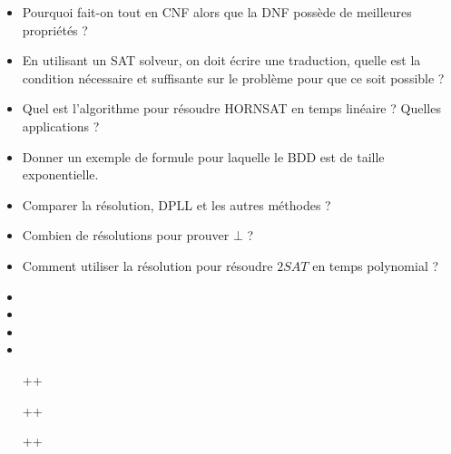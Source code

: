 \documentclass{agregfiche}
\begin{document}
\begin{itemize}
    \item Pourquoi fait-on tout en CNF alors que la DNF possède de meilleures
      propriétés ?
    \item En utilisant un SAT solveur, on doit écrire une traduction, quelle
        est la condition nécessaire et suffisante sur le problème pour que ce soit
        possible ?
    \item Quel est l'algorithme pour résoudre HORNSAT en temps linéaire ?
        Quelles applications ?
    \item Donner un exemple de formule pour laquelle le BDD est de
    taille
        exponentielle.
      \item Comparer la résolution, DPLL et les autres méthodes ?
      \item Combien de résolutions pour prouver $\bot$ ?
      \item Comment utiliser la résolution pour résoudre $2SAT$ en temps polynomial ?
\end{itemize}

\secreferences

\begin{itemize}
    \item 
    \item 
    \item 
    \item 

\end{itemize}

\secdev

\begin{itemize}

\item[++] 
\item[++] 
\item[++] 
\end{itemize}
\end{document}
